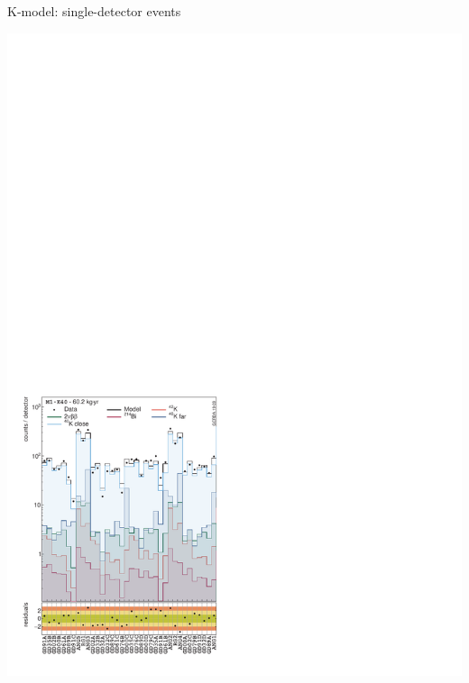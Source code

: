 \documentclass[10pt,aspectratio=169]{beamer}
\begin{document}
\begin{frame}{K-model: single-detector events}
  \begin{center}
    \includegraphics[height=0.85\textheight]{plots/bkg/raw/ph2/results/kmodel/kmodel-1d-ds0.pdf}

\end{center}
\end{frame}
\end{document}
